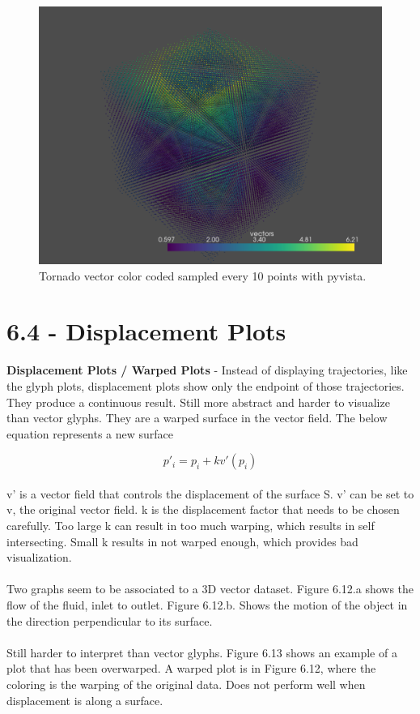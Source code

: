 \documentclass{article}
\begin{document}
\begin{figure}[H]
\caption{Tornado vector color coded sampled every 10 points with pyvista.}
\centering
\includegraphics[scale=.4]{tornado_color_coding.png}
\end{figure}

\section*{6.4 - Displacement Plots}
\textbf{Displacement Plots / Warped Plots} - Instead of displaying trajectories, like the glyph plots, displacement plots show only the endpoint of those trajectories. They produce a continuous result. Still more abstract and harder to visualize than vector glyphs. They are a warped surface in the vector field. The below equation represents a new surface

\begin{equation}
    p'_i = p_i + kv'(p_i)
\end{equation}
\\
v' is a vector field that controls the displacement of the surface S. v' can be set to v, the original vector field. k is the displacement factor that needs to be chosen carefully. Too large k can result in too much warping, which results in self intersecting. Small k results in not warped enough, which provides bad visualization.
\\\\
Two graphs seem to be associated to a 3D vector dataset. Figure 6.12.a shows the flow of the fluid, inlet to outlet. Figure 6.12.b. Shows the motion of the object in the direction perpendicular to its surface.
\\\\
Still harder to interpret than vector glyphs. Figure 6.13 shows an example of a plot that has been overwarped. A warped plot is in Figure 6.12, where the coloring is the warping of the original data. Does not perform well when displacement is along a surface.
\end{document}
